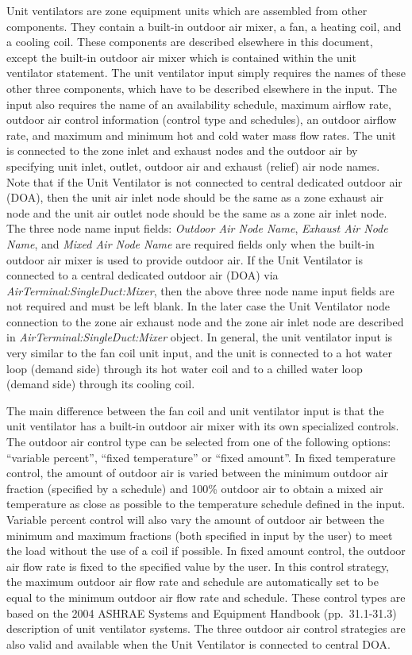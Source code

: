 Unit ventilators are zone equipment units which are assembled from other components. They contain a built-in outdoor air mixer, a fan, a heating coil, and a cooling coil. These components are described elsewhere in this document, except the built-in outdoor air mixer which is contained within the unit ventilator statement. The unit ventilator input simply requires the names of these other three components, which have to be described elsewhere in the input. The input also requires the name of an availability schedule, maximum airflow rate, outdoor air control information (control type and schedules), an outdoor airflow rate, and maximum and minimum hot and cold water mass flow rates. The unit is connected to the zone inlet and exhaust nodes and the outdoor air by specifying unit inlet, outlet, outdoor air and exhaust (relief) air node names. Note that if the Unit Ventilator is not connected to central dedicated outdoor air (DOA), then the unit air inlet node should be the same as a zone exhaust air node and the unit air outlet node should be the same as a zone air inlet node. The three node name input fields: \textit{Outdoor Air Node Name}, \textit{Exhaust Air Node Name}, and \textit{Mixed Air Node Name} are required fields only when the built-in outdoor air mixer is used to provide outdoor air. If the Unit Ventilator is connected to a central dedicated outdoor air (DOA) via \textit{AirTerminal:SingleDuct:Mixer}, then the above three node name input fields are not required and must be left blank. In the later case the Unit Ventilator node connection to the zone air exhaust node and the zone air inlet node are described in \textit{AirTerminal:SingleDuct:Mixer} object. In general, the unit ventilator input is very similar to the fan coil unit input, and the unit is connected to a hot water loop (demand side) through its hot water coil and to a chilled water loop (demand side) through its cooling coil.

The main difference between the fan coil and unit ventilator input is that the unit ventilator has a built-in outdoor air mixer with its own specialized controls. The outdoor air control type can be selected from one of the following options: ``variable percent'', ``fixed temperature'' or ``fixed amount''. In fixed temperature control, the amount of outdoor air is varied between the minimum outdoor air fraction (specified by a schedule) and 100\% outdoor air to obtain a mixed air temperature as close as possible to the temperature schedule defined in the input. Variable percent control will also vary the amount of outdoor air between the minimum and maximum fractions (both specified in input by the user) to meet the load without the use of a coil if possible. In fixed amount control, the outdoor air flow rate is fixed to the specified value by the user. In this control strategy, the maximum outdoor air flow rate and schedule are automatically set to be equal to the minimum outdoor air flow rate and schedule. These control types are based on the 2004 ASHRAE Systems and Equipment Handbook (pp.~31.1-31.3) description of unit ventilator systems. The three outdoor air control strategies are also valid and available when the Unit Ventilator is connected to central DOA.

